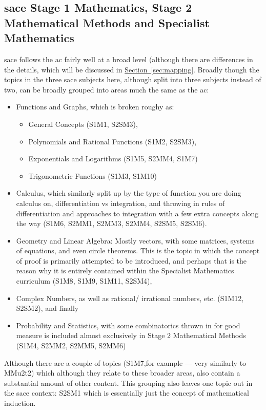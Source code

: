 \documentclass[twoside,12pt,a4paper]{report}
\newcommand{\refsec}[1]{\hyperref[sec:#1]{Section~\ref{sec:#1}}}
\begin{document}
\subsection{\gls{sace} Stage 1 Mathematics, Stage 2 Mathematical Methods and Specialist Mathematics}

\gls{sace} follows the \gls{ac} fairly well at a broad level (although there are differences in the details, which will be discussed in \refsec{mapping}. Broadly though the topics in the three \gls{sace} subjects here, although split into three subjects instead of two, can be broadly grouped into areas much the same as the \gls{ac}:
\begin{itemize}
	\item Functions and Graphs, which is broken roughy as:
		\begin{itemize}	
			\item General Concepts (S1M1, S2SM3),
			\item Polynomials and Rational Functions (S1M2, S2SM3),
			\item Exponentials and Logarithms (S1M5, S2MM4, S1M7)
			\item Trigonometric Functions (S1M3, S1M10)
		\end{itemize}
	\item Calculus, which similarly split up by the type of function you are doing calculus on, differentiation vs integration, and throwing in rules of differentiation and approaches to integration with a few extra concepts along the way (S1M6, S2MM1, S2MM3, S2MM4, S2SM5, S2SM6).
	\item Geometry and Linear Algebra: Mostly vectors, with some matrices, systems of equations, and even circle theorems. This is the topic in which the concept of proof is primarily attempted to be introduced, and perhaps that is the reason why it is entirely contained within the Specialist Mathematics curriculum (S1M8, S1M9, S1M11, S2SM4),
	\item Complex Numbers, as well as rational/ irrational numbers, etc. (S1M12, S2SM2), and finally
	\item Probability and Statistics, with some combinatorics thrown in for good measure is included almost exclusively in Stage 2 Mathematical Methods (S1M4, S2MM2, S2MM5, S2MM6)
\end{itemize}
Although there are a couple of topics (S1M7,for example --- very similarly to MMu2t2) which although they relate to these broader areas, also contain a substantial amount of other content. This grouping also leaves one topic out in the \gls{sace} context: S2SM1 which is essentially just the concept of mathematical induction.
\end{document}
